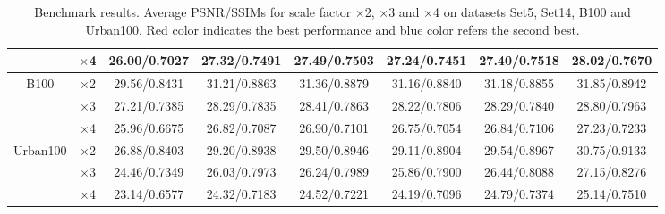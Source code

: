 \documentclass[10pt,twocolumn,letterpaper]{article}
\begin{document}
\begin{table}
\begin{center}
\begin{tabular}{ | c | c | c | c | c | c | c | c | }
 & $\times$4 & 26.00/0.7027 & 27.32/0.7491 & {\color{blue}27.49}/0.7503 & 27.24/0.7451 & 27.40/{\color{blue}0.7518} & {\color{red}28.02}/{\color{red}0.7670}\\
\hline
\hline
\multirow{3}{*}{B100} & $\times$2 & 29.56/0.8431 & 31.21/0.8863 & {\color{blue}31.36}/{\color{blue}0.8879} & 31.16/0.8840 & 31.18/0.8855 & {\color{red}31.85}/{\color{red}0.8942}\\
 & $\times$3 & 27.21/0.7385 & 28.29/0.7835 & {\color{blue}28.41}/{\color{blue}0.7863} & 28.22/0.7806 & 28.29/0.7840 & {\color{red}28.80}/{\color{red}0.7963}\\
 & $\times$4 & 25.96/0.6675 & 26.82/0.7087 & {\color{blue}26.90}/0.7101 & 26.75/0.7054 & 26.84/{\color{blue}0.7106} & {\color{red}27.23}/{\color{red}0.7233}\\
\hline
\hline
\multirow{3}{*}{Urban100} & $\times$2 & 26.88/0.8403 & 29.20/0.8938 & 29.50/0.8946 & 29.11/0.8904 & {\color{blue}29.54}/{\color{blue}0.8967} & {\color{red}30.75}/{\color{red}0.9133}\\
 & $\times$3 & 24.46/0.7349 & 26.03/0.7973 & 26.24/0.7989 & 25.86/0.7900 & {\color{blue}26.44}/{\color{blue}0.8088} & {\color{red}27.15}/{\color{red}0.8276}\\
 & $\times$4 & 23.14/0.6577 & 24.32/0.7183 & 24.52/0.7221 & 24.19/0.7096 & {\color{blue}24.79}/{\color{blue}0.7374} & {\color{red}25.14}/{\color{red}0.7510}\\
\hline
\end{tabular}
\caption{Benchmark results. Average PSNR/SSIMs for scale factor $\times$2, $\times$3 and $\times$4 on datasets Set5, Set14, B100 and Urban100. {\color{red}Red color} indicates the best performance and {\color{blue}blue color} refers the second best.}
\label{tbl:benchmark}
\end{center}
\end{table}
\end{document}
